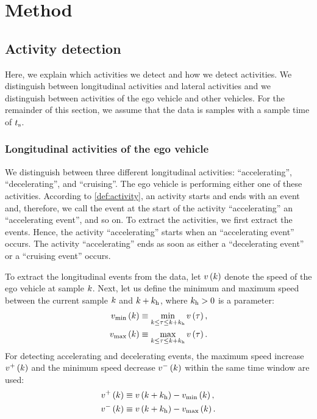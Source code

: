\section{Method}
\label{sec:method}



\subsection{Activity detection}
\label{sec:activity detection}

Here, we explain which activities we detect and how we detect activities. We distinguish between longitudinal activities and lateral activities and we distinguish between activities of the ego vehicle and other vehicles. For the remainder of this section, we assume that the data is samples with a sample time of $t_\mathrm{s}$.



\subsubsection{Longitudinal activities of the ego vehicle}
\label{sec:longitudinal ego}


We distinguish between three different longitudinal activities: ``accelerating'', ``decelerating'', and ``cruising''. The ego vehicle is performing either one of these activities. According to \cref{def:activity}, an activity starts and ends with an event and, therefore, we call the event at the start of the activity ``accelerating'' an ``accelerating event'', and so on. To extract the activities, we first extract the events. Hence, the activity ``accelerating'' starts when an ``accelerating event'' occurs. The activity ``accelerating'' ends as soon as either a ``decelerating event'' or a ``cruising event'' occurs.

To extract the longitudinal events from the data, let $v\left(k\right)$ denote the speed of the ego vehicle at sample $k$. Next, let us define the minimum and maximum speed between the current sample $k$ and $k+k_{\mathrm{h}}$, where $k_{\mathrm{h}}>0$ is a parameter:
\begin{align}
	v_{\mathrm{min}}\left(k\right) &\equiv \min_{k \leq \tau \leq k+k_{\mathrm{h}}} v\left(\tau\right), \\
	v_{\mathrm{max}}\left(k\right) &\equiv \max_{k \leq \tau \leq k+k_{\mathrm{h}}} v\left(\tau\right).
\end{align}
For detecting accelerating and decelerating events, the maximum speed increase $v^{+}\left(k\right)$ and the minimum speed decrease $v^{-}\left(k\right)$ within the same time window are used:
\begin{align}
	v^{+}\left(k\right) &\equiv v\left(k + k_{\mathrm{h}}\right) - v_{\mathrm{min}}\left(k\right),\\
	v^{-}\left(k\right) &\equiv v\left(k + k_{\mathrm{h}}\right) - v_{\mathrm{max}}\left(k\right).
\end{align}

